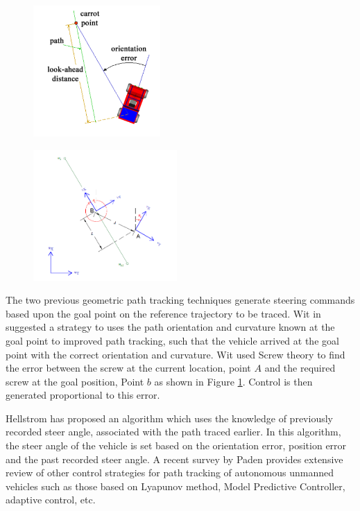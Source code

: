\begin{figure}
	\centering
	\begin{minipage}{.5\textwidth}
		\centering
		\includegraphics[height=5cm,keepaspectratio]{Chapter2/fig/FollowTheCarrot}
		\label{fig:FollowCarrot}
	\end{minipage}%
	\begin{minipage}{.5\textwidth}
		\centering
		\includegraphics[width=1\linewidth,height=5cm,keepaspectratio]{Chapter2/fig/VectorPursuit}
		\label{fig:VectorPursuit}
	\end{minipage}
\end{figure}
The two previous geometric path tracking techniques  generate steering commands based upon the goal point on the reference trajectory to be traced. 
Wit in \cite{wit2004autonomous} suggested a strategy to uses the path orientation and curvature  known at the goal point to improved path tracking,  such that the vehicle arrived at the goal point  with the correct orientation and curvature. Wit used Screw theory to find the error between the screw at the current location, point $A$  and the required screw at the goal position, Point $b$ as shown in Figure \ref{fig:VectorPursuit}. Control is then generated proportional to this error.

Hellstrom \cite{hellstrom2006follow} has proposed an algorithm which uses the knowledge of previously recorded steer angle, associated with  the path traced earlier. In this algorithm, the steer angle of the vehicle is set based on the orientation error, position error and the past recorded steer angle. A recent survey by Paden \cite{paden2016survey} provides extensive review of other control strategies for path tracking of autonomous unmanned vehicles such as those based on Lyapunov method, Model Predictive Controller, adaptive control, etc. 


